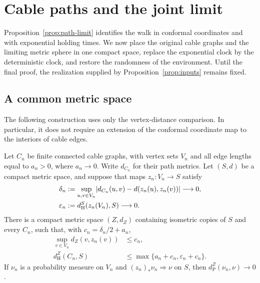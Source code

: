 \section{Cable paths and the joint limit}\label{sec:paths}

Proposition~\ref{prop:path-limit} identifies the walk in conformal
coordinates and with exponential holding times.  We now place the original
cable graphs and the limiting metric sphere in one compact space, replace
the exponential clock by the deterministic clock, and restore the
randomness of the environment.  Until the final proof, the realization
supplied by Proposition~\ref{prop:inputs} remains fixed.

\subsection{A common metric space}

The following construction uses only the vertex-distance comparison.  In
particular, it does not require an extension of the conformal coordinate
map to the interiors of cable edges.

\begin{lemma}\label{lem:ambient-space}
Let $C_n$ be finite connected cable graphs, with vertex sets $V_n$ and
all edge lengths equal to $a_n>0$, where $a_n\to0$.  Write $d_{C_n}$ for
their path metrics.  Let $(S,d)$ be a compact metric space, and suppose
that maps $z_n:V_n\to S$ satisfy
\begin{align*}
 \delta_n&:=\sup_{u,v\in V_n}
  \lvert d_{C_n}(u,v)-d(z_n(u),z_n(v))\rvert\longrightarrow0,\\
 \varepsilon_n&:=d_{\mathrm H}^{S}(z_n(V_n),S)\longrightarrow0.
\end{align*}
There is a compact metric space $(Z,d_Z)$ containing isometric copies of
$S$ and every $C_n$, such that, with $c_n=\delta_n/2+a_n$,
\begin{align}
 \sup_{v\in V_n}d_Z(v,z_n(v))&\le c_n,
 \label{eq:vertex-bridges}\\
 d_{\mathrm H}^{Z}(C_n,S)&\le
  \max\{a_n+c_n,\varepsilon_n+c_n\}.
 \label{eq:cable-hausdorff}
\end{align}
If $\nu_n$ is a probability measure on $V_n$ and
$(z_n)_*\nu_n\Rightarrow\nu$ on $S$, then
$d_{\mathrm P}^{Z}(\nu_n,\nu)\to0$.
\end{lemma}

